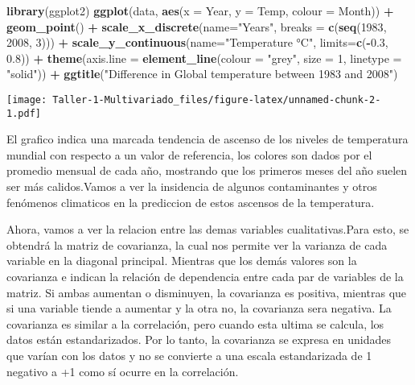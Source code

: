 \documentclass[]{article}
\newenvironment{Shaded}{\begin{snugshade}}{\end{snugshade}}
\newcommand{\KeywordTok}[1]{\textcolor[rgb]{0.13,0.29,0.53}{\textbf{#1}}}
\newcommand{\DataTypeTok}[1]{\textcolor[rgb]{0.13,0.29,0.53}{#1}}
\newcommand{\DecValTok}[1]{\textcolor[rgb]{0.00,0.00,0.81}{#1}}
\newcommand{\FloatTok}[1]{\textcolor[rgb]{0.00,0.00,0.81}{#1}}
\newcommand{\StringTok}[1]{\textcolor[rgb]{0.31,0.60,0.02}{#1}}
\newcommand{\OperatorTok}[1]{\textcolor[rgb]{0.81,0.36,0.00}{\textbf{#1}}}
\newcommand{\NormalTok}[1]{#1}
\begin{document}
\begin{Shaded}
\begin{Highlighting}[]
\KeywordTok{library}\NormalTok{(ggplot2)}
\KeywordTok{ggplot}\NormalTok{(data, }\KeywordTok{aes}\NormalTok{(}\DataTypeTok{x =}\NormalTok{ Year, }\DataTypeTok{y =}\NormalTok{ Temp, }\DataTypeTok{colour =}\NormalTok{ Month)) }\OperatorTok{+}
\StringTok{  }\KeywordTok{geom_point}\NormalTok{() }\OperatorTok{+}\StringTok{ }
\StringTok{  }\KeywordTok{scale_x_discrete}\NormalTok{(}\DataTypeTok{name=}\StringTok{"Years"}\NormalTok{, }\DataTypeTok{breaks =} \KeywordTok{c}\NormalTok{(}\KeywordTok{seq}\NormalTok{(}\DecValTok{1983}\NormalTok{, }\DecValTok{2008}\NormalTok{, }\DecValTok{3}\NormalTok{))) }\OperatorTok{+}\StringTok{ }
\StringTok{  }\KeywordTok{scale_y_continuous}\NormalTok{(}\DataTypeTok{name=}\StringTok{"Temperature °C"}\NormalTok{, }\DataTypeTok{limits=}\KeywordTok{c}\NormalTok{(}\OperatorTok{-}\FloatTok{0.3}\NormalTok{, }\FloatTok{0.8}\NormalTok{)) }\OperatorTok{+}\StringTok{ }
\StringTok{  }\KeywordTok{theme}\NormalTok{(}\DataTypeTok{axis.line =} \KeywordTok{element_line}\NormalTok{(}\DataTypeTok{colour =} \StringTok{"grey"}\NormalTok{, }
                      \DataTypeTok{size =} \DecValTok{1}\NormalTok{, }\DataTypeTok{linetype =} \StringTok{"solid"}\NormalTok{)) }\OperatorTok{+}\StringTok{ }
\StringTok{  }\KeywordTok{ggtitle}\NormalTok{(}\StringTok{"Difference in Global temperature between 1983 and 2008"}\NormalTok{)}
\end{Highlighting}
\end{Shaded}

\texttt{[image: Taller-1-Multivariado\_files/figure-latex/unnamed-chunk-2-1.pdf]}

El grafico indica una marcada tendencia de ascenso de los niveles de
temperatura mundial con respecto a un valor de referencia, los colores
son dados por el promedio mensual de cada año, mostrando que los
primeros meses del año suelen ser más calidos.Vamos a ver la insidencia
de algunos contaminantes y otros fenómenos climaticos en la prediccion
de estos ascensos de la temperatura.

Ahora, vamos a ver la relacion entre las demas variables
cualitativas.Para esto, se obtendrá la matriz de covarianza, la cual nos
permite ver la varianza de cada variable en la diagonal principal.
Mientras que los demás valores son la covarianza e indican la relación
de dependencia entre cada par de variables de la matriz. Si ambas
aumentan o disminuyen, la covarianza es positiva, mientras que si una
variable tiende a aumentar y la otra no, la covarianza sera negativa. La
covarianza es similar a la correlación, pero cuando esta ultima se
calcula, los datos están estandarizados. Por lo tanto, la covarianza se
expresa en unidades que varían con los datos y no se convierte a una
escala estandarizada de 1 negativo a +1 como sí ocurre en la
correlación.
\end{document}
